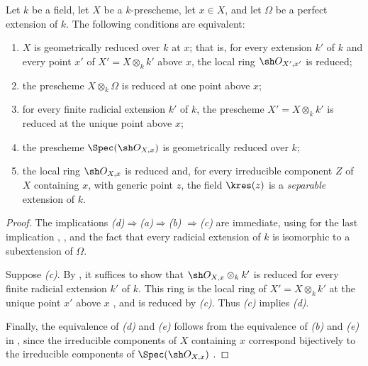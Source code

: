 \begin{proposition}[4.6.12]
\label{IV.4.6.12}
Let $k$ be a field, let $X$ be a $k$-prescheme, let $x\in X$, and let
$\Omega$ be a perfect extension of $k$.
The following conditions are equivalent:
\begin{enumerate}
\item[\rm(a)]
\label{IV.4.6.12.a}
$X$ is geometrically reduced over $k$ at $x$; that is, for every
extension $k'$ of $k$ and every point $x'$ of
$X'=X\otimes_k k'$ above $x$, the local ring
$\sh O_{X',x'}$ is reduced;

\item[\rm(b)]
\label{IV.4.6.12.b}
the prescheme $X\otimes_k\Omega$ is reduced at one point above $x$;

\item[\rm(c)]
\label{IV.4.6.12.c}
for every finite radicial extension $k'$ of $k$, the prescheme
$X'=X\otimes_k k'$ is reduced at the unique point above $x$;

\item[\rm(d)]
\label{IV.4.6.12.d}
the prescheme $\Spec(\sh O_{X,x})$ is geometrically reduced over $k$;

\item[\rm(e)]
\label{IV.4.6.12.e}
the local ring $\sh O_{X,x}$ is reduced and, for every irreducible
component $Z$ of $X$ containing $x$, with generic point $z$, the field
$\kres(z)$ is a \emph{separable} extension of $k$.
\end{enumerate}
\end{proposition}

\begin{proof}
The implications
\emph{(d)}$\Rightarrow$\emph{(a)}$\Rightarrow$\emph{(b)}
$\Rightarrow$\emph{(c)} are immediate, using for the last implication
, , and the fact that every radicial
extension of $k$ is isomorphic to a subextension of $\Omega$.

Suppose \emph{(c)}.
By , it suffices to show that
$\sh O_{X,x}\otimes_k k'$ is reduced for every finite radicial
extension $k'$ of $k$.
This ring is the local ring of $X'=X\otimes_k k'$ at the unique point
$x'$ above $x$  , and is reduced by
\emph{(c)}.
Thus \emph{(c)} implies \emph{(d)}.

Finally, the equivalence of \emph{(d)} and \emph{(e)} follows from the
equivalence of \emph{(b)} and \emph{(e)} in , since the
irreducible components of $X$ containing $x$ correspond bijectively
to the irreducible components of $\Spec(\sh O_{X,x})$
.
\end{proof}

